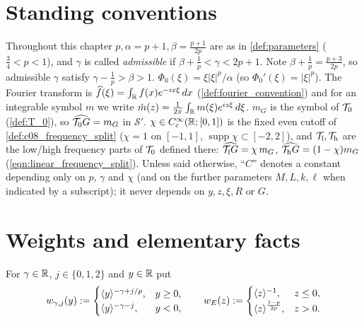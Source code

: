 
\section{Standing conventions}

Throughout this chapter $p,\alpha=p+1,\beta=\frac{p+1}{2p}$ are as in \cref{def:parameters}
($\frac34<p<1$), and $\gamma$ is called \emph{admissible} if $\beta+\frac1p<\gamma<2p+1$.
Note $\beta+\frac1p=\frac{p+3}{2p}$, so admissible $\gamma$ satisfy $\gamma-\frac1p>\beta>1$.
$\Phi_0(\xi)=\xi|\xi|^p/\alpha$ (so $\Phi_0'(\xi)=|\xi|^p$). The Fourier transform is
$\widehat f(\xi)=\int_{\mathbb{R}} f(x)e^{-ix\xi}\,dx$ (\cref{def:fourier_convention}) and for an integrable symbol
$m$ we write $\check{m}(z)=\frac1{2\pi}\int_{\mathbb{R}} m(\xi)e^{iz\xi}\,d\xi$.
$m_G$ is the symbol of $\mathcal{T}_0$ (\cref{def:T_0}), so $\widehat{\mathcal{T}_0G}=m_G$ in $\mathcal S'$.
$\chi\in C^\infty_c(\mathbb{R};[0,1])$ is the fixed even cutoff of \cref{def:c08_frequency_split} ($\chi=1$ on $[-1,1]$,
$\operatorname{supp}\chi\subset[-2,2]$), and $\mathcal{T}_{\textup{l}},\mathcal{T}_{\textup{h}}$ are the low/high frequency parts of $\mathcal{T}_0$ defined there:
$\widehat{\mathcal{T}_{\textup{l}}G}=\chi\,m_G$, $\widehat{\mathcal{T}_{\textup{h}}G}=(1-\chi)m_G$ (\eqref{eqn:linear_frequency_split}).
Unless said otherwise, ``$C$'' denotes a constant depending only on $p$, $\gamma$ and $\chi$
(and on the further parameters $M,L,k,\ell$ when indicated by a subscript); it never depends on
$y,z,\xi,R$ or $G$.

\section{Weights and elementary facts}

\begin{definition}[Weights]
  \label{def:c09_weights}
  For $\gamma\in\mathbb{R}$, $j\in\{0,1,2\}$ and $y\in\mathbb{R}$ put
  \[
    w_{\gamma,j}(y):=\begin{cases}\langle y \rangle^{-\gamma+j/p},&y\ge0,\\ \langle y \rangle^{-\gamma-j},&y<0,\end{cases}
    \qquad
    w_E(z):=\begin{cases}\langle z \rangle^{-1},&z\le0,\\ \langle z \rangle^{\frac{1-p}{2p}},&z>0.\end{cases}
  \]
\end{definition}

